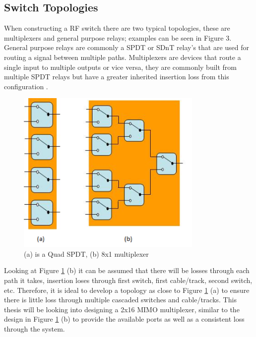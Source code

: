 \documentclass[12pt,openany,a4paper]{book}
\begin{document}
\subsection{Switch Topologies}
When constructing a RF switch there are two typical topologies, these are multiplexers and general purpose relays; examples can be seen in Figure 3. General purpose relays are commonly a SPDT or SDnT relay's that are used for routing a signal between multiple paths. Multiplexers are devices that route a single input to multiple outputs or vice versa, they are commonly built from multiple SPDT relays but have a greater inherited insertion loss from this configuration \cite{ref13}.
\begin{figure}[H]
	\centering
    \includegraphics[width=0.8\textwidth]{topology.png}
	\caption{(a) is a Quad SPDT, (b) 8x1 multiplexer}
	\label{fig:topology}
\end{figure} 
Looking at Figure \ref{fig:topology} (b) it can be assumed that there will be losses through each path it takes, insertion loses through first switch, first cable/track, second switch, etc. Therefore, it is ideal to develop a topology as close to Figure \ref{fig:topology} (a) to ensure there is little loss through multiple cascaded switches and cable/tracks. This thesis will be looking into designing a 2x16 MIMO multiplexer, similar to the design in Figure \ref{fig:topology} (b) to provide the available ports as well as a consistent loss through the system.

\end{document}
